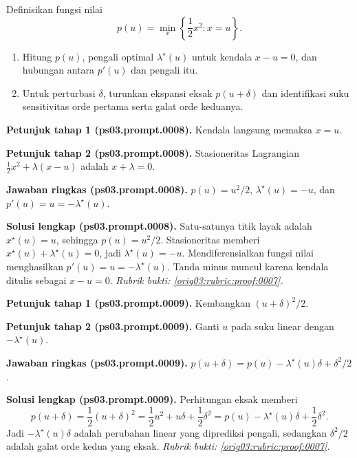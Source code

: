 \begin{exercise}
\label{orig03:ps03:problem:0004}
Definisikan fungsi nilai
\[
 p(u)=\min_x\left\{\frac12x^2:x=u\right\}.
\]
\begin{enumerate}
\item\label{orig03:ps03:prompt:0008}
Hitung $p(u)$, pengali optimal $\lambda^\star(u)$ untuk kendala $x-u=0$,
dan hubungan antara $p'(u)$ dan pengali itu.
\item\label{orig03:ps03:prompt:0009}
Untuk perturbasi $\delta$, turunkan ekspansi eksak $p(u+\delta)$ dan
identifikasi suku sensitivitas orde pertama serta galat orde keduanya.
\end{enumerate}
\end{exercise}

\par\noindent\textbf{Petunjuk tahap 1 (ps03.prompt.0008).}
Kendala langsung memaksa $x=u$.
\label{orig03:ps03:hint1:0008}
\par\noindent\textbf{Petunjuk tahap 2 (ps03.prompt.0008).}
Stasioneritas Lagrangian
$\tfrac12x^2+\lambda(x-u)$ adalah $x+\lambda=0$.
\label{orig03:ps03:hint2:0008}
\par\noindent\textbf{Jawaban ringkas (ps03.prompt.0008).}
$p(u)=u^2/2$, $\lambda^\star(u)=-u$, dan
$p'(u)=u=-\lambda^\star(u)$.
\label{orig03:ps03:answer:0008}
\par\noindent\textbf{Solusi lengkap (ps03.prompt.0008).}
Satu-satunya titik layak adalah $x^\star(u)=u$, sehingga
$p(u)=u^2/2$. Stasioneritas memberi
$x^\star(u)+\lambda^\star(u)=0$, jadi $\lambda^\star(u)=-u$.
Mendiferensialkan fungsi nilai menghasilkan
$p'(u)=u=-\lambda^\star(u)$. Tanda minus muncul karena kendala ditulis
sebagai $x-u=0$.
\emph{Rubrik bukti: \ref{orig03:rubric:proof:0007}.}
\label{orig03:ps03:solution:0008}

\par\noindent\textbf{Petunjuk tahap 1 (ps03.prompt.0009).}
Kembangkan $(u+\delta)^2/2$.
\label{orig03:ps03:hint1:0009}
\par\noindent\textbf{Petunjuk tahap 2 (ps03.prompt.0009).}
Ganti $u$ pada suku linear dengan $-\lambda^\star(u)$.
\label{orig03:ps03:hint2:0009}
\par\noindent\textbf{Jawaban ringkas (ps03.prompt.0009).}
$p(u+\delta)=p(u)-\lambda^\star(u)\delta+\delta^2/2$.
\label{orig03:ps03:answer:0009}
\par\noindent\textbf{Solusi lengkap (ps03.prompt.0009).}
Perhitungan eksak memberi
\[
 p(u+\delta)=\frac12(u+\delta)^2
 =\frac12u^2+u\delta+\frac12\delta^2
 =p(u)-\lambda^\star(u)\delta+\frac12\delta^2.
\]
Jadi $-\lambda^\star(u)\delta$ adalah perubahan linear yang diprediksi
pengali, sedangkan $\delta^2/2$ adalah galat orde kedua yang eksak.
\emph{Rubrik bukti: \ref{orig03:rubric:proof:0007}.}
\label{orig03:ps03:solution:0009}

